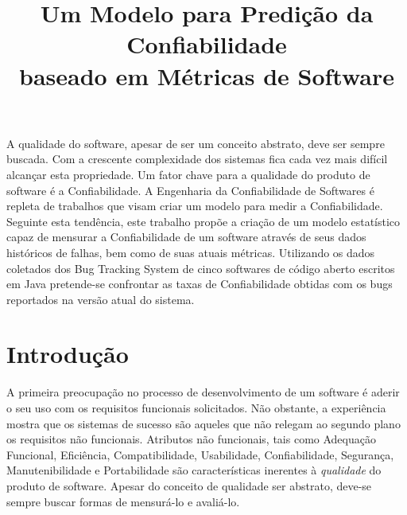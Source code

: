 \documentclass[12pt]{article}
\title{Um Modelo para Predição da Confiabilidade\\
	  baseado em Métricas de Software}
\begin{document}
 

\maketitle

     
\begin{resumo} 
  A qualidade do software, apesar de ser um conceito abstrato, deve ser sempre buscada. Com a crescente complexidade dos sistemas fica cada vez mais difícil alcançar esta propriedade. Um fator chave para a qualidade do produto de software é a Confiabilidade. A Engenharia da Confiabilidade de Softwares é repleta de trabalhos que visam criar um modelo para medir a Confiabilidade. Seguinte esta tendência, este trabalho propõe a criação de um modelo estatístico capaz de mensurar a Confiabilidade de um software através de seus dados históricos de falhas, bem como de suas atuais métricas. Utilizando os dados coletados dos Bug Tracking System de cinco softwares de código aberto escritos em Java pretende-se confrontar as taxas de Confiabilidade obtidas com os bugs reportados na versão atual do sistema.
\end{resumo}


\section{Introdução}
\label{sec:intro}

A primeira preocupação no processo de desenvolvimento de um software é aderir o seu uso com os requisitos funcionais solicitados. Não obstante, a experiência mostra que os sistemas de sucesso são aqueles que não relegam ao segundo plano os requisitos não funcionais. Atributos não funcionais, tais como Adequação Funcional, Eficiência, Compatibilidade, Usabilidade, Confiabilidade, Segurança, Manutenibilidade e Portabilidade são características inerentes à \textit{qualidade} do produto de software\cite{citeulike:10951538}{}. Apesar do conceito de qualidade ser abstrato, deve-se sempre buscar formas de mensurá-lo e avaliá-lo.
\end{document}
